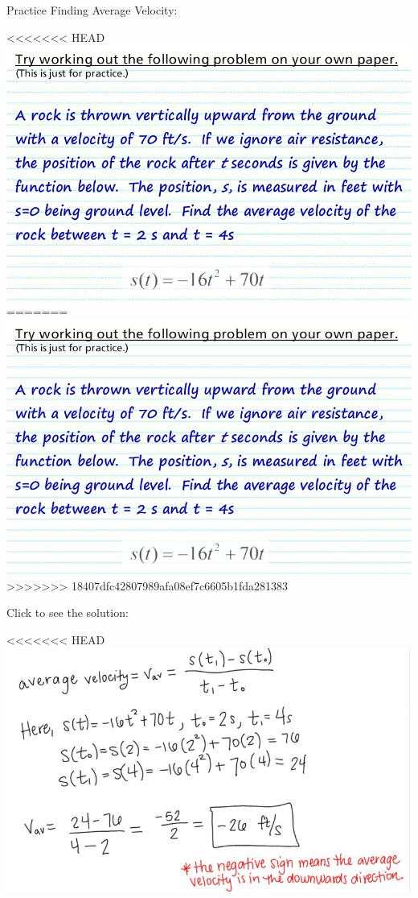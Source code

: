 \documentclass{ximera}
\begin{document}
Practice Finding Average Velocity:
\begin{foldable}
\begin{image}
<<<<<<< HEAD
\includegraphics{picture1.gif}
=======
\includegraphics{picture1.jpg}
>>>>>>> 18407dfc42807989afa08ef7c6605b1fda281383
\end{image}
Click to see the solution:
\begin{foldable}
\begin{image}
<<<<<<< HEAD
\includegraphics{picture2.gif}

\end{image}
\end{foldable}
\end{foldable}
\end{document}
